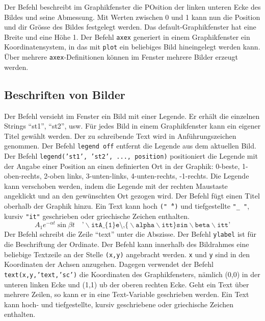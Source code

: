 \newline\newline
Der Befehl  beschreibt im Graphikfenster die POsition der linken unteren Ecke des Bildes und seine Abmessung. Mit Werten zwischen 0 und 1 kann nun die Position und dir Grösse des Bildes festgelegt werden. Das default-Graphikfenster hat eine Breite und eine Höhe 1. Der Befehl {\color{red}\texttt{axex}} generiert in einem Graphikfenster ein Koordinatensystem, in das mit {\color{red}\texttt{plot}} ein beliebiges Bild hineingelegt werden kann. Über mehrere {\color{red}\texttt{axex}}-Definitionen können im Fenster mehrere Bilder erzeugt werden.
\subsection{Beschriften von Bilder}
Der Befehl  versieht im Fenster ein Bild mit einer Legende. Er erhält die einzelnen Strings ``st1'', ``st2'', usw. Für jedes Bild in einem Graphikfenster kann ein eigener Titel gewählt werden. Der zu schreibende Text wird in Anführungszeichen genommen. Der Befehl {\color{red}\texttt{legend off}} entfernt die Legende aus dem aktuellen Bild. Der Befehl {\color{red}\texttt{legend('st1', 'st2', ..., position)}} positioniert die Legende mit der Angabe einer Position an einen definierten Ort in der Graphik: 0-beste, 1-oben-rechts, 2-oben links, 3-unten-links, 4-unten-rechts, -1-rechts. Die Legende kann verschoben werden, indem die Legende mit der rechten Maustaste angeklickt und an den gewünschten Ort gezogen wird.
\newline\newline
Der Befehl  fügt einen Titel oberhalb der Graphik hinzu. Ein Text kann hoch \texttt{("\^\,")} und tiefgestellte \texttt{"\_\,"}, kursiv \texttt{"it"} geschrieben oder griechische Zeichen enthalten.
\begin{equation}
\boxed{A_1e^{-\alpha t}\sin \beta t\quad \texttt{'$\backslash$itA\_\{1\}e\^\,\{$\backslash$alpha$\backslash$itt\}sin$\backslash$beta$\backslash$itt'}}
\end{equation}
Der Befehl  schreibt die Zeile ``text'' unter die Abszisse. Der Befehl \texttt{ylabel} ist für die Beschriftung der Ordinate.
\newline\newline
Der Befehl  kann innerhalb des Bildrahmes eine beliebige Textzeile an der Stelle \texttt{(x,y)} angebracht werden. \texttt{x} und \texttt{y} sind in den Koordinaten der Achsen anzugehen. Dagegen verwendet der Befehl {\color{red}\texttt{text(x,y,'text,'sc')}} die Koordinaten des Graphikfensters, nämlich (0,0) in der unteren linken Ecke und (1,1) ub der oberen rechten Ecke. Geht ein Text über mehrere Zeilen, so kann er in eine Text-Variable geschrieben werden. Ein Text kann hoch- und tiefgestellte, kursiv geschriebene oder griechische Zeichen enthalten.

